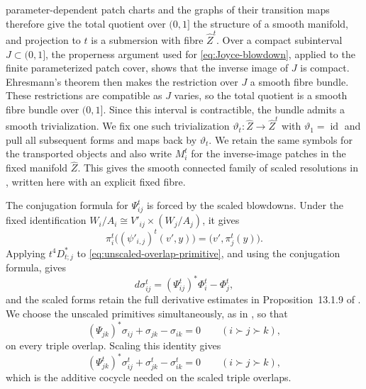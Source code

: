 \documentclass[11pt]{article}
\theoremstyle{remark}\newtheorem{remark}[theorem]{Remark}
\newcommand{\id}{\operatorname{id}}
\begin{document}
parameter-dependent patch charts and the graphs of their transition maps
therefore give the total quotient over $(0,1]$ the structure of a smooth
manifold, and projection to $t$ is a submersion with fibre $\widehat Z^t$.
Over a compact subinterval $J\subset(0,1]$, the properness argument used
for \eqref{eq:Joyce-blowdown}, applied to the finite parameterized patch
cover, shows that the inverse image of $J$ is compact.  Ehresmann's theorem
then makes the restriction over $J$ a smooth fibre bundle.  These
restrictions are compatible as $J$ varies, so the total quotient is a
smooth fibre bundle over $(0,1]$.  Since this interval is contractible,
the bundle admits a smooth trivialization.  We fix one such trivialization
$\vartheta_t:\widehat Z\to\widehat Z^t$ with $\vartheta_1=\id$ and pull
all subsequent forms and maps back by $\vartheta_t$.  We retain the same
symbols for the transported objects and also write $M_i^t$ for the
inverse-image patches in the fixed manifold $\widehat Z$.  This
gives the smooth connected family of scaled resolutions in
\cite[Definition 13.4.1]{JoyceBook}, written here with an explicit fixed
fibre.

The conjugation formula for $\Psi_{ij}^t$ is forced by the scaled
blowdowns.  Under the fixed identification
$W_i/A_i\cong V'_{ij}\times(W_j/A_j)$, it gives
\[
 \pi_i^t\bigl((\psi'_{i,j})^t(v',y)\bigr)
   =\bigl(v',\pi_j^t(y)\bigr).
\]
Applying $t^4D_{t;j}^*$ to
\eqref{eq:unscaled-overlap-primitive}, and using the conjugation formula,
gives
\begin{equation}\label{eq:overlap-primitive}
 d\sigma_{ij}^t=
 (\Psi_{ij}^t)^*\Phi_i^t-\Phi_j^t,
\end{equation}
and the scaled forms retain the full derivative estimates in
Proposition~13.1.9 of \cite{JoyceBook}.  We choose the unscaled primitives
simultaneously, as in \cite[Section 13.3.1]{JoyceBook}, so that
\[
(\Psi_{jk})^*\sigma_{ij}
 +\sigma_{jk}-\sigma_{ik}=0
\qquad(i\succ j\succ k),
\]
on every triple overlap.  Scaling this identity gives
\[
(\Psi_{jk}^t)^*\sigma_{ij}^t
 +\sigma_{jk}^t-\sigma_{ik}^t=0
\qquad(i\succ j\succ k),
\]
which is the additive cocycle needed on the scaled triple overlaps.
\end{document}
